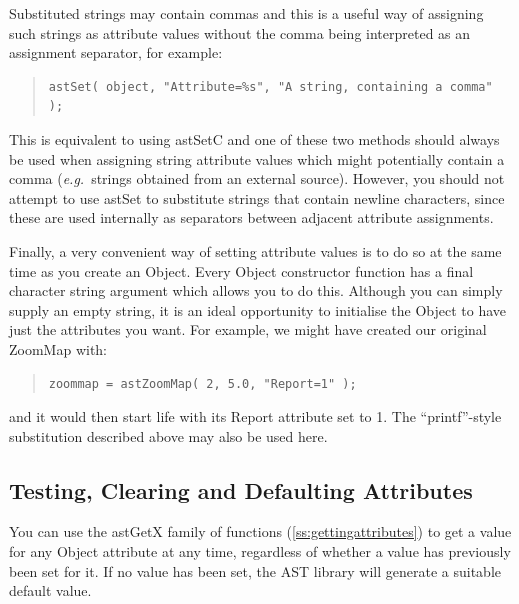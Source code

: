 \documentclass[twoside,11pt]{article}
\newcommand{\htmlref}[2]{#1}
\newcommand{\secref}[1]{\S\ref{#1}}
\renewcommand{\secref}[1]{\ref{#1}}
\begin{document}
Substituted strings may contain commas and this is a useful way of
assigning such strings as attribute values without the comma being
interpreted as an assignment separator, for example:

\begin{quote}
\small
\begin{verbatim}
astSet( object, "Attribute=%s", "A string, containing a comma" );
\end{verbatim}
\normalsize
\end{quote}

This is equivalent to using astSetC and one of these two methods
should always be used when assigning string attribute values which
might potentially contain a comma ({\em{e.g.}}\ strings obtained from
an external source). However, you should not attempt to use astSet to
substitute strings that contain newline characters, since these are
used internally as separators between adjacent attribute assignments.
\label{ss:attributeinitialisation}

Finally, a very convenient way of setting attribute values is to do so
at the same time as you create an Object. Every Object constructor
function has a final character string argument which allows you to do
this. Although you can simply supply an empty string, it is an ideal
opportunity to initialise the Object to have just the attributes you
want. For example, we might have created our original ZoomMap with:

\begin{quote}
\small
\begin{verbatim}
zoommap = astZoomMap( 2, 5.0, "Report=1" );
\end{verbatim}
\normalsize
\end{quote}

and it would then start life with its Report attribute set to 1.
The ``printf''-style substitution described above may also be used
here.

\subsection{\label{ss:defaultingattributes}Testing, Clearing and Defaulting Attributes}

You can use the astGetX family of functions
(\secref{ss:gettingattributes}) to get a value for any \htmlref{Object}{Object} attribute
at any time, regardless of whether a value has previously been set for
it. If no value has been set, the AST library will generate a suitable
default value.
\end{document}
